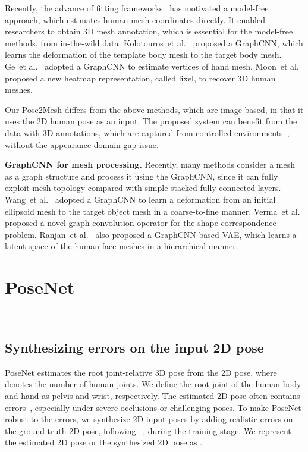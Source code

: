 \documentclass[runningheads]{llncs}
\begin{document}
Recently, the advance of fitting frameworks~\cite{bogo2016keep,pavlakos2019expressive} has motivated a model-free approach, which estimates human mesh coordinates directly.
It enabled researchers to obtain 3D mesh annotation, which is essential for the model-free methods, from in-the-wild data. Kolotouros~et al.~\cite{kolotouros2019cmr} proposed a GraphCNN, which learns the deformation of the template body mesh to the target body mesh. 
Ge~et al.~\cite{ge2019handgcn} adopted a GraphCNN to estimate vertices of hand mesh.
Moon~et al.~\cite{moon2020i2l} proposed a new heatmap representation, called lixel, to recover 3D human meshes.

Our Pose2Mesh differs from the above methods, which are image-based, in that it uses the 2D human pose as an input.
The proposed system can benefit from the data with 3D annotations, which are captured from
controlled environments~\cite{ionescu2014human3,Joo2015panoptic}, without the appearance domain gap issue.


\noindent\textbf{GraphCNN for mesh processing.}
Recently, many methods consider a mesh as a graph structure and process it using the GraphCNN, since it can fully exploit mesh topology compared with simple stacked fully-connected layers.
Wang~et al.~\cite{wang2018pix2mesh} adopted a GraphCNN to learn a deformation from an initial ellipsoid mesh to the target object mesh in a coarse-to-fine manner.
Verma~et al.~\cite{verma2018featStNet} proposed a novel graph convolution operator for the shape correspondence problem.
Ranjan~et al.~\cite{ranjan2018comma} also proposed a GraphCNN-based VAE, which learns a latent space of the human face meshes in a hierarchical manner.
 \vspace{-3mm}
\section{PoseNet}~\label{sec:posenet}
\vspace{-12mm}
\subsection{Synthesizing errors on the input 2D pose}
PoseNet estimates the root joint-relative 3D pose  from the 2D pose, where  denotes the number of human joints.
We define the root joint of the human body and hand as pelvis and wrist, respectively.
The estimated 2D pose often contains errors~\cite{ruggero2017benchmarking}, especially under severe occlusions or challenging poses.
To make PoseNet robust to the errors, we synthesize 2D input poses by adding realistic errors on the ground truth 2D pose, following ~\cite{Moon_2019_CVPR_PoseFix,chang2020abs}, during the training stage.
We represent the estimated 2D pose or the synthesized 2D pose as .
\end{document}
